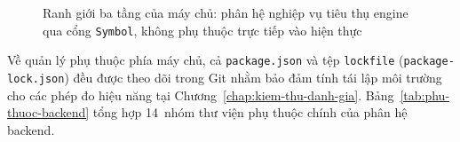 \begin{figure}[htbp]
{%
}
\caption{Ranh giới ba tầng của máy chủ: phân hệ nghiệp vụ tiêu thụ engine qua cổng \texttt{Symbol}, không phụ thuộc trực tiếp vào hiện thực}
\label{fig:ranh-gioi-ba-tang-be}
\end{figure}

Về quản lý phụ thuộc phía máy chủ, cả \texttt{package.json} và tệp \texttt{lockfile} (\texttt{package-\allowbreak{}lock.\allowbreak{}json}) đều được theo dõi trong Git nhằm bảo đảm tính tái lập môi trường cho các phép đo hiệu năng tại Chương~\ref{chap:kiem-thu-danh-gia}. Bảng~\ref{tab:phu-thuoc-backend} tổng hợp 14~nhóm thư viện phụ thuộc chính của phân hệ backend.

